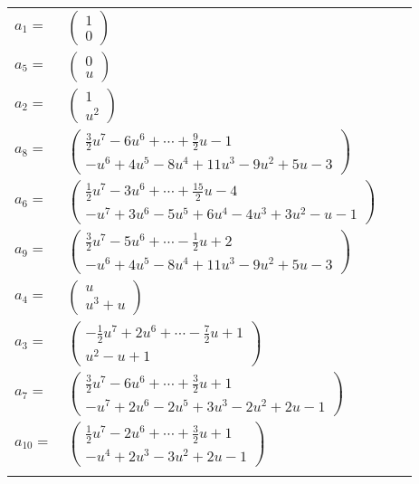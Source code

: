 \documentclass[1p]{elsarticle_modified}
\theoremstyle{definition}
\begin{document}
\begin{tabular}{m{7pt} m{180pt} m{7pt} m{180pt} }
\flushright $a_{1}=$&$\begin{pmatrix}1\\0\end{pmatrix}$ \\
\flushright $a_{5}=$&$\begin{pmatrix}0\\u\end{pmatrix}$ \\
\flushright $a_{2}=$&$\begin{pmatrix}1\\u^2\end{pmatrix}$ \\
\flushright $a_{8}=$&$\begin{pmatrix}\frac{3}{2} u^7-6 u^6+\cdots+\frac{9}{2} u-1\\- u^6+4 u^5-8 u^4+11 u^3-9 u^2+5 u-3\end{pmatrix}$ \\
\flushright $a_{6}=$&$\begin{pmatrix}\frac{1}{2} u^7-3 u^6+\cdots+\frac{15}{2} u-4\\- u^7+3 u^6-5 u^5+6 u^4-4 u^3+3 u^2- u-1\end{pmatrix}$ \\
\flushright $a_{9}=$&$\begin{pmatrix}\frac{3}{2} u^7-5 u^6+\cdots-\frac{1}{2} u+2\\- u^6+4 u^5-8 u^4+11 u^3-9 u^2+5 u-3\end{pmatrix}$ \\
\flushright $a_{4}=$&$\begin{pmatrix}u\\u^3+u\end{pmatrix}$ \\
\flushright $a_{3}=$&$\begin{pmatrix}-\frac{1}{2} u^7+2 u^6+\cdots-\frac{7}{2} u+1\\u^2- u+1\end{pmatrix}$ \\
\flushright $a_{7}=$&$\begin{pmatrix}\frac{3}{2} u^7-6 u^6+\cdots+\frac{3}{2} u+1\\- u^7+2 u^6-2 u^5+3 u^3-2 u^2+2 u-1\end{pmatrix}$ \\
\flushright $a_{10}=$&$\begin{pmatrix}\frac{1}{2} u^7-2 u^6+\cdots+\frac{3}{2} u+1\\- u^4+2 u^3-3 u^2+2 u-1\end{pmatrix}$\\&\end{tabular}
\end{document}
